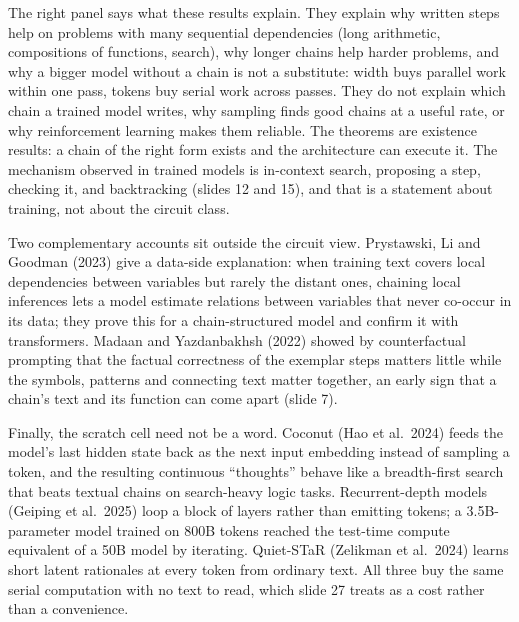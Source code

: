 \documentclass[11pt,letterpaper]{article}
\begin{document}
The right panel says what these results explain. They explain why written steps help on problems with many sequential dependencies (long arithmetic, compositions of functions, search), why longer chains help harder problems, and why a bigger model without a chain is not a substitute: width buys parallel work within one pass, tokens buy serial work across passes. They do not explain which chain a trained model writes, why sampling finds good chains at a useful rate, or why reinforcement learning makes them reliable. The theorems are existence results: a chain of the right form exists and the architecture can execute it. The mechanism observed in trained models is in-context search, proposing a step, checking it, and backtracking (slides 12 and 15), and that is a statement about training, not about the circuit class.

Two complementary accounts sit outside the circuit view. Prystawski, Li and Goodman (2023) give a data-side explanation: when training text covers local dependencies between variables but rarely the distant ones, chaining local inferences lets a model estimate relations between variables that never co-occur in its data; they prove this for a chain-structured model and confirm it with transformers. Madaan and Yazdanbakhsh (2022) showed by counterfactual prompting that the factual correctness of the exemplar steps matters little while the symbols, patterns and connecting text matter together, an early sign that a chain's text and its function can come apart (slide 7).

Finally, the scratch cell need not be a word. Coconut (Hao et al.\ 2024) feeds the model's last hidden state back as the next input embedding instead of sampling a token, and the resulting continuous ``thoughts'' behave like a breadth-first search that beats textual chains on search-heavy logic tasks. Recurrent-depth models (Geiping et al.\ 2025) loop a block of layers rather than emitting tokens; a 3.5B-parameter model trained on 800B tokens reached the test-time compute equivalent of a 50B model by iterating. Quiet-STaR (Zelikman et al.\ 2024) learns short latent rationales at every token from ordinary text. All three buy the same serial computation with no text to read, which slide 27 treats as a cost rather than a convenience.
\end{document}

